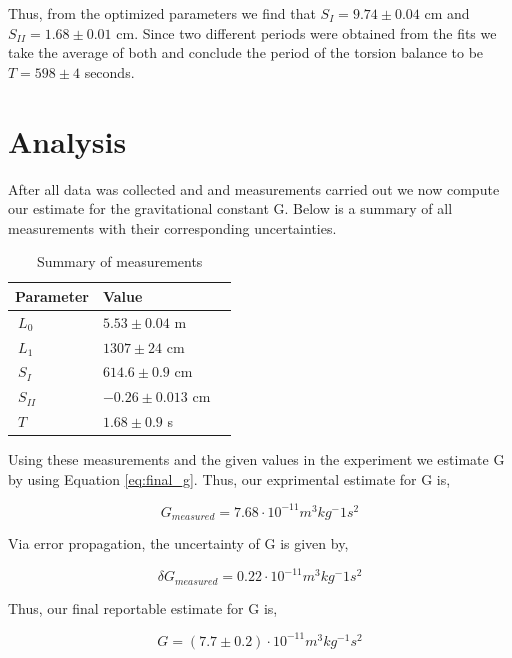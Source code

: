 \documentclass[twoside,twocolumn]{article}
\begin{document}
Thus, from the optimized parameters we find that $S_{I} = 9.74 \pm 0.04$ cm
and $S_{II} = 1.68 \pm 0.01$ cm. Since two different periods were obtained
from the fits we take the average of both and conclude the period of the torsion
balance to be $T= 598 \pm 4$ seconds.

\section{Analysis}

After all data was collected and and measurements carried out we now compute our estimate for the gravitational
constant G. Below is a summary of all measurements with their corresponding uncertainties.

\begin{table}[H]
\centering
\begin{tabular}{llr}
\toprule
\cmidrule(r){1-2}
Parameter & Value \\
\midrule
$\ L_{0}$ & $ 5.53 \pm 0.04 $ m \\
$\ L_{1}$ & $ 1307 \pm 24 $ cm \\
$\ S_{I}$ & $ 614.6 \pm 0.9 $ cm \\
$\ S_{II}$ & $ -0.26 \pm 0.013 $ cm \\
$\ T$ & $ 1.68 \pm 0.9 $ s \\
\bottomrule
\end{tabular}
\caption{Summary of measurements}
\end{table}

Using these measurements and the given values in the experiment we estimate G by using Equation
\ref{eq:final_g}. Thus, our exprimental estimate for G is,

\begin{equation}
\label{eq:g_measured}
  G_{measured} = 7.68 \cdot 10^{-11} m^3kg^-1s^2
\end{equation}

Via error propagation, the uncertainty of G is given by,

\begin{equation}
\label{eq:final_g}
  \delta G_{measured} = 0.22 \cdot 10^{-11} m^3kg^-1s^2
\end{equation}

Thus, our final reportable estimate for G is,

\begin{equation}
\label{eq:g_measured}
  \boxed{G = (7.7 \pm 0.2)\cdot 10^{-11} m^3kg^{-1}s^2}
\end{equation}
\end{document}
